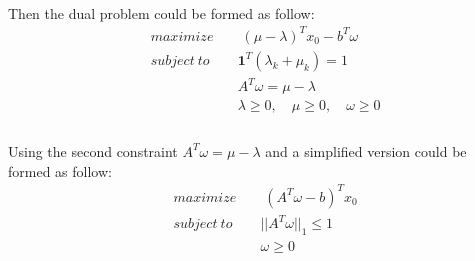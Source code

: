 \documentclass[12pt]{article}
\begin{document}
\paragraph*{}
Then the dual problem could be formed as follow:
\begin{align*}
&maximize \qquad (\mu - \lambda)^T x_0 - b^T \omega\\
&subject \ to \qquad \textbf{1}^T ( \lambda_k + \mu_k)= 1\\
& \qquad \qquad \qquad  \ A^T \omega = \mu - \lambda\\
& \qquad \qquad \qquad  \ \lambda \geq 0, \quad \mu \geq 0,\quad \omega \geq 0\\
\end{align*}
%
\paragraph*{}
Using the second constraint $ A^T \omega = \mu - \lambda$ and a simplified version could be formed as follow:
\begin{align*}
&maximize \qquad (A^T\omega - b)^T x_0\\
&subject \ to \qquad ||A^T\omega||_1 \leq 1\\
& \qquad \qquad \qquad \ \omega \geq 0
\end{align*}
%
\end{document}
